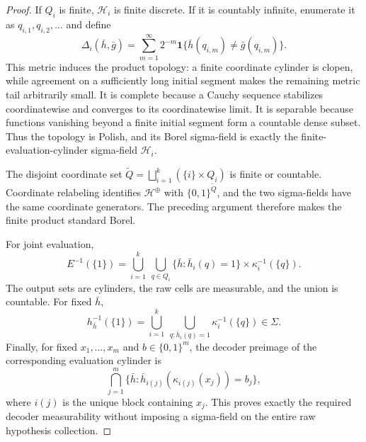 \begin{proof}
If \(Q_i\) is finite, \(\mathcal H_i\) is finite discrete.  If it is
countably infinite, enumerate it as \(q_{i,1},q_{i,2},\ldots\) and define
\begin{equation}\label{eq:step-001-product-metric}
\Delta_i(\bar h,\bar g)
=\sum_{m=1}^{\infty}2^{-m}
\mathbf1\{\bar h(q_{i,m})\ne\bar g(q_{i,m})\}.
\end{equation}
This metric induces the product topology: a finite coordinate cylinder is
clopen, while agreement on a sufficiently long initial segment makes the
remaining metric tail arbitrarily small.  It is complete because a Cauchy
sequence stabilizes coordinatewise and converges to its coordinatewise
limit.  It is separable because functions vanishing beyond a finite initial
segment form a countable dense subset.  Thus the topology is Polish, and
its Borel sigma-field is exactly the finite-evaluation-cylinder sigma-field
\(\mathscr H_i\).

The disjoint coordinate set
\(
\widetilde Q=\bigsqcup_{i=1}^k(\{i\}\times Q_i)
\)
is finite or countable.  Coordinate relabeling identifies
\(\mathcal H^{\oplus}\) with \(\{0,1\}^{\widetilde Q}\), and the two
sigma-fields have the same coordinate generators.  The preceding argument
therefore makes the finite product standard Borel.

For joint evaluation,
\begin{equation}\label{eq:step-001-joint-evaluation}
E^{-1}(\{1\})
=\bigcup_{i=1}^k\ \bigcup_{q\in Q_i}
\{\bar h:\bar h_i(q)=1\}
\times\kappa_i^{-1}(\{q\}).
\end{equation}
The output sets are cylinders, the raw cells are measurable, and the union
is countable.  For fixed \(\bar h\),
\[
h_{\bar h}^{-1}(\{1\})
=\bigcup_{i=1}^k\ \bigcup_{q:\bar h_i(q)=1}
\kappa_i^{-1}(\{q\})\in\Sigma.
\]
Finally, for fixed \(x_1,\ldots,x_m\) and \(b\in\{0,1\}^m\), the decoder
preimage of the corresponding evaluation cylinder is
\begin{equation}\label{eq:step-001-decoder-cylinder}
\bigcap_{j=1}^m
\{\bar h:\bar h_{i(j)}(\kappa_{i(j)}(x_j))=b_j\},
\end{equation}
where \(i(j)\) is the unique block containing \(x_j\).  This proves exactly
the required decoder measurability without imposing a sigma-field on the
entire raw hypothesis collection.
\end{proof}

